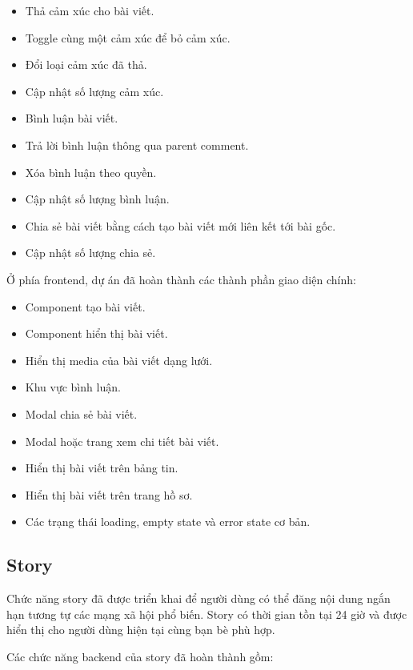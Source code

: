 \documentclass[12pt,a4paper]{article}
\begin{document}
\begin{itemize}
  \item Thả cảm xúc cho bài viết.
  \item Toggle cùng một cảm xúc để bỏ cảm xúc.
  \item Đổi loại cảm xúc đã thả.
  \item Cập nhật số lượng cảm xúc.
  \item Bình luận bài viết.
  \item Trả lời bình luận thông qua parent comment.
  \item Xóa bình luận theo quyền.
  \item Cập nhật số lượng bình luận.
  \item Chia sẻ bài viết bằng cách tạo bài viết mới liên kết tới bài gốc.
  \item Cập nhật số lượng chia sẻ.
\end{itemize}

Ở phía frontend, dự án đã hoàn thành các thành phần giao diện chính:

\begin{itemize}
  \item Component tạo bài viết.
  \item Component hiển thị bài viết.
  \item Hiển thị media của bài viết dạng lưới.
  \item Khu vực bình luận.
  \item Modal chia sẻ bài viết.
  \item Modal hoặc trang xem chi tiết bài viết.
  \item Hiển thị bài viết trên bảng tin.
  \item Hiển thị bài viết trên trang hồ sơ.
  \item Các trạng thái loading, empty state và error state cơ bản.
\end{itemize}

\subsection{Story}

Chức năng story đã được triển khai để người dùng có thể đăng nội dung ngắn hạn tương tự các mạng xã hội phổ biến. Story có thời gian tồn tại 24 giờ và được hiển thị cho người dùng hiện tại cùng bạn bè phù hợp.

Các chức năng backend của story đã hoàn thành gồm:
\end{document}
